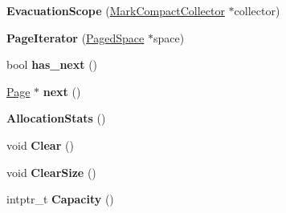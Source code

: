 \begin{DoxyCompactItemize}
\item 
{\bfseries Evacuation\+Scope} (\hyperlink{classv8_1_1internal_1_1_mark_compact_collector}{Mark\+Compact\+Collector} $\ast$collector)\hypertarget{classv8_1_1internal_1_1_b_a_s_e___e_m_b_e_d_d_e_d_a43abcf69bed52202811b807595c02181}{}\label{classv8_1_1internal_1_1_b_a_s_e___e_m_b_e_d_d_e_d_a43abcf69bed52202811b807595c02181}

\item 
{\bfseries Page\+Iterator} (\hyperlink{classv8_1_1internal_1_1_paged_space}{Paged\+Space} $\ast$space)\hypertarget{classv8_1_1internal_1_1_b_a_s_e___e_m_b_e_d_d_e_d_adde176ee972a81734680b146af7c37a7}{}\label{classv8_1_1internal_1_1_b_a_s_e___e_m_b_e_d_d_e_d_adde176ee972a81734680b146af7c37a7}

\item 
bool {\bfseries has\+\_\+next} ()\hypertarget{classv8_1_1internal_1_1_b_a_s_e___e_m_b_e_d_d_e_d_aa2ac82cadaae4e30bffa924340110f78}{}\label{classv8_1_1internal_1_1_b_a_s_e___e_m_b_e_d_d_e_d_aa2ac82cadaae4e30bffa924340110f78}

\item 
\hyperlink{classv8_1_1internal_1_1_page}{Page} $\ast$ {\bfseries next} ()\hypertarget{classv8_1_1internal_1_1_b_a_s_e___e_m_b_e_d_d_e_d_a0d352d344bd2e0fcc946f574649011d3}{}\label{classv8_1_1internal_1_1_b_a_s_e___e_m_b_e_d_d_e_d_a0d352d344bd2e0fcc946f574649011d3}

\item 
{\bfseries Allocation\+Stats} ()\hypertarget{classv8_1_1internal_1_1_b_a_s_e___e_m_b_e_d_d_e_d_adbf7bf6ed5fef9ff654a183c5c5a37a5}{}\label{classv8_1_1internal_1_1_b_a_s_e___e_m_b_e_d_d_e_d_adbf7bf6ed5fef9ff654a183c5c5a37a5}

\item 
void {\bfseries Clear} ()\hypertarget{classv8_1_1internal_1_1_b_a_s_e___e_m_b_e_d_d_e_d_ab116508b5f5cbaedc057424d77489933}{}\label{classv8_1_1internal_1_1_b_a_s_e___e_m_b_e_d_d_e_d_ab116508b5f5cbaedc057424d77489933}

\item 
void {\bfseries Clear\+Size} ()\hypertarget{classv8_1_1internal_1_1_b_a_s_e___e_m_b_e_d_d_e_d_a577d1e640bfaf355b9723f8d39354d02}{}\label{classv8_1_1internal_1_1_b_a_s_e___e_m_b_e_d_d_e_d_a577d1e640bfaf355b9723f8d39354d02}

\item 
intptr\+\_\+t {\bfseries Capacity} ()\hypertarget{classv8_1_1internal_1_1_b_a_s_e___e_m_b_e_d_d_e_d_a75cc911c63d063e157eb3abde586b128}{}\label{classv8_1_1internal_1_1_b_a_s_e___e_m_b_e_d_d_e_d_a75cc911c63d063e157eb3abde586b128}


\end{DoxyCompactItemize}
